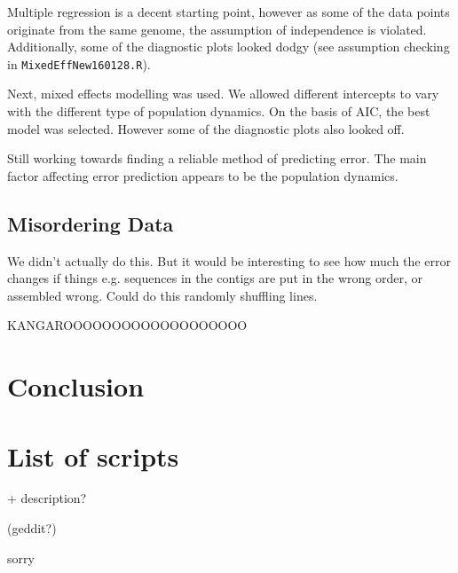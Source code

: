 \documentclass[11pt,a4paper]{article}
\begin{document}
Multiple regression is a decent starting point, however as some of the data points originate from the same genome, the assumption of independence is violated. Additionally, some of the diagnostic plots looked dodgy (see assumption checking in \verb|MixedEffNew160128.R|).

Next, mixed effects modelling was used. We allowed different intercepts to vary with the different type of population dynamics. On the basis of AIC, the best model was selected. However some of the diagnostic plots also looked off.

Still working towards finding a reliable method of predicting error. The main factor affecting error prediction appears to be the population dynamics.

\subsection{Misordering Data}
We didn't actually do this. But it would be interesting to see how much the error changes if things e.g. sequences in the contigs are put in the wrong order, or assembled wrong. Could do this randomly shuffling lines.

KANGAROOOOOOOOOOOOOOOOOOO

\section{Conclusion}

\appendix
\section{List of scripts}
+ description?

(geddit?)

sorry


{}
\end{document}

